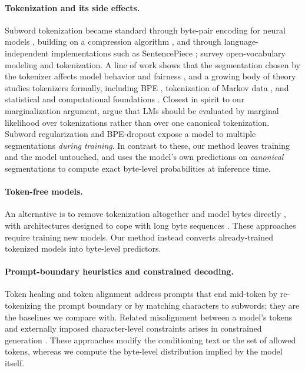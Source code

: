 \documentclass{article} %
\begin{document}
\paragraph{Tokenization and its side effects.} Subword tokenization became standard through byte-pair encoding for neural models \citep{sennrich2016bpe}, building on a compression algorithm \citep{gage1994bpe}, and through language-independent implementations such as SentencePiece \citep{kudo2018sentencepiece}; \citet{mielke2021words} survey open-vocabulary modeling and tokenization. A line of work shows that the segmentation chosen by the tokenizer affects model behavior and fairness \citep{petrov2023unfairness,singh2024tokenization,land2024magikarp}, and a growing body of theory studies tokenizers formally, including BPE \citep{zouhar2023formal}, tokenization of Markov data \citep{rajaraman2024theory}, and statistical and computational foundations \citep{gastaldi2024foundations}. Closest in spirit to our marginalization argument, \citet{cao2021marginal} argue that LMs should be evaluated by marginal likelihood over tokenizations rather than over one canonical tokenization. Subword regularization \citep{kudo2018subword} and BPE-dropout \citep{provilkov2020bpedropout} expose a model to multiple segmentations \emph{during training}. In contrast to these, our method leaves training and the model untouched, and uses the model's own predictions on \emph{canonical} segmentations to compute exact byte-level probabilities at inference time.

\paragraph{Token-free models.} An alternative is to remove tokenization altogether and model bytes directly \citep{xue2022byt5}, with architectures designed to cope with long byte sequences \citep{yu2023megabyte,slagle2024spacebyte,wang2024mambabyte}. These approaches require training new models. Our method instead converts already-trained tokenized models into byte-level predictors.

\paragraph{Prompt-boundary heuristics and constrained decoding.} Token healing \citep{dagan2024tokenizer} and token alignment \citep{athiwaratkun2024alignment} address prompts that end mid-token by re-tokenizing the prompt boundary or by matching characters to subwords; they are the baselines we compare with. Related misalignment between a model's tokens and externally imposed character-level constraints arises in constrained generation \citep{beurerkellner2024domino}. These approaches modify the conditioning text or the set of allowed tokens, whereas we compute the byte-level distribution implied by the model itself.
\end{document}
